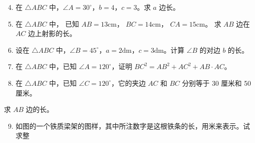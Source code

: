 \begin{enumerate}
\setcounter{enumi}{3}
\item
  在 \(\triangle ABC\)
  中，\(\angle A = 30^{\circ}\)，\(b = 4\)，\(c = 3\)。求 \(a\) 边长。
\item
  在 \(\triangle ABC\) 中， 已知 \(AB = 13\mathrm{cm}\)，
  \(BC = 14\mathrm{cm}\)， \(CA = 15\mathrm{cm}\)。 求 \(AB\) 边在
  \(AC\) 边上射影的长。
\item
  设在 \(\triangle ABC\)
  中，\(\angle B = 45^{\circ}\)，\(a = 2\mathrm{dm}\)，\(c = 3\mathrm{dm}\)。计算
  \(\angle B\) 的对边 \(b\) 的长。
\item
  在 \(\triangle ABC\) 中，已知 \(\angle A = 120^{\circ}\)，证明
  \(BC^{2} = AB^{2} + AC^{2} + AB \cdot AC\)。
\item
  在 \(\triangle ABC\) 中，已知 \(\angle C = 120^{\circ}\)，它的夹边
  \(AC\) 和 \(BC\) 分别等于 30 厘米和 50 厘米。
\end{enumerate}

求 \(AB\) 边的长。

\begin{enumerate}
\setcounter{enumi}{8}
\item
  如图的一个铁质梁架的图样，其中所注数字是这根铁条的长，用米来表示。试求整
\end{enumerate}


